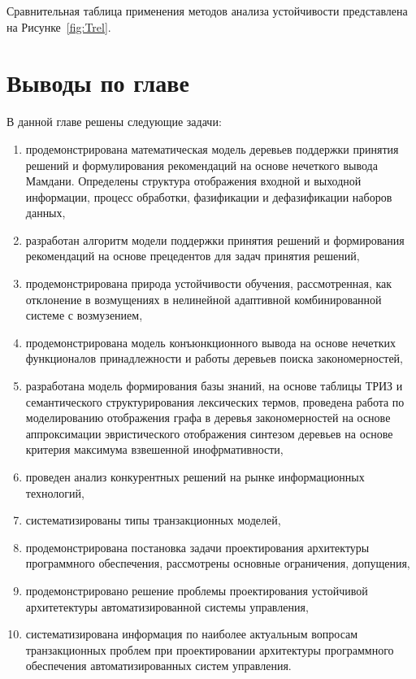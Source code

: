 Сравнительная таблица применения методов анализа устойчивости представлена на Рисунке~\cref{fig:Trel}.

\section{Выводы по главе}\label{sec:ch2/conc}

В данной главе решены следующие задачи:
\begin{enumerate}
    \item продемонстрирована математическая модель деревьев поддержки принятия решений и формулирования рекомендаций на основе нечеткого вывода Мамдани. Определены структура отображения входной и выходной информации, процесс обработки, фазификации и дефазификации наборов данных,
    \item разработан алгоритм модели поддержки принятия решений и формирования рекомендаций на основе прецедентов для задач принятия решений,
    \item продемонстрирована природа устойчивости обучения, рассмотренная, как отклонение в возмущениях в нелинейной адаптивной комбинированной системе с возмузением,
    \item продемонстрирована модель конъюнкционного вывода на основе нечетких функционалов принадлежности и работы деревьев поиска закономерностей,
    \item разработана модель формирования базы знаний, на основе таблицы ТРИЗ и семантического структурирования лексических термов, проведена работа по моделированию отображения графа в деревья закономерностей на основе аппроксимации эвристического отображения синтезом деревьев на основе критерия максимума взвешенной инофрмативности,
	\item проведен анализ конкурентных решений на рынке информационных технологий,
	\item систематизированы типы транзакционных моделей, 
	\item продемонстрирована постановка задачи проектирования архитектуры программного обеспечения, рассмотрены основные ограничения, допущения,
	\item продемонстрировано решение проблемы проектирования устойчивой архитетектуры автоматизированной системы управления,
	\item систематизирована информация по наиболее актуальным вопросам транзакционных проблем при проектировании архитектуры программного обеспечения автоматизированных систем управления.
\end{enumerate}

